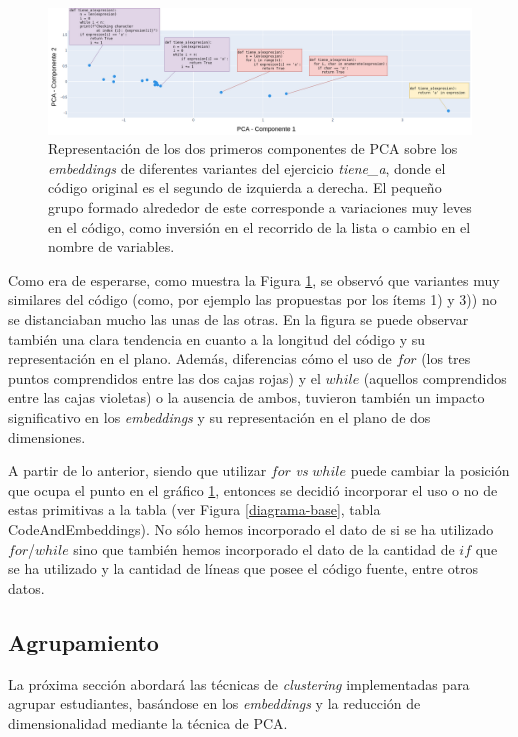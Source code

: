 \documentclass[11pt,a4paper,twoside,openany]{tesis}
\begin{document}
\begin{figure}[H]
    \centering
    \includegraphics[width=\textwidth]{imagenes/codigo-similar.png}
    \caption{Representación de los dos primeros componentes de PCA sobre los \emph{embeddings} de diferentes variantes del ejercicio \emph{tiene\_a}, donde el código original es el segundo de izquierda a derecha. El pequeño grupo formado alrededor de este corresponde a variaciones muy leves en el código, como inversión en el recorrido de la lista o cambio en el nombre de variables.}
     \label{variaciones-codigo}
\end{figure}

Como era de esperarse, como muestra la Figura \ref{variaciones-codigo}, se observó que variantes muy similares del código (como, por ejemplo las propuestas por los ítems 1) y 3)) no se distanciaban mucho las unas de las otras. En la figura se puede observar también una clara tendencia en cuanto a la longitud del código y su representación en el plano. Además, diferencias cómo el uso de $for$ (los tres puntos comprendidos entre las dos cajas rojas) y el $while$ (aquellos comprendidos entre las cajas violetas) o la ausencia de ambos, tuvieron también un impacto significativo en los \emph{embeddings} y su representación en el plano de dos dimensiones.

A partir de lo anterior, siendo que utilizar $for$ \emph{vs} $while$ puede cambiar la posición que ocupa el punto en el gráfico \ref{variaciones-codigo}, entonces se decidió incorporar el uso o no de estas primitivas a la tabla (ver Figura \ref{diagrama-base}, tabla CodeAndEmbeddings). No sólo hemos incorporado el dato de si se ha utilizado $for$/$while$ sino que también hemos incorporado el dato de la cantidad de $if$ que se ha utilizado y la cantidad de líneas que posee el código fuente, entre otros datos.

\subsection{Agrupamiento}

La próxima sección abordará las técnicas de \emph{clustering} implementadas para agrupar estudiantes, basándose en los \emph{embeddings} y la reducción de dimensionalidad mediante la técnica de PCA.
\end{document}

